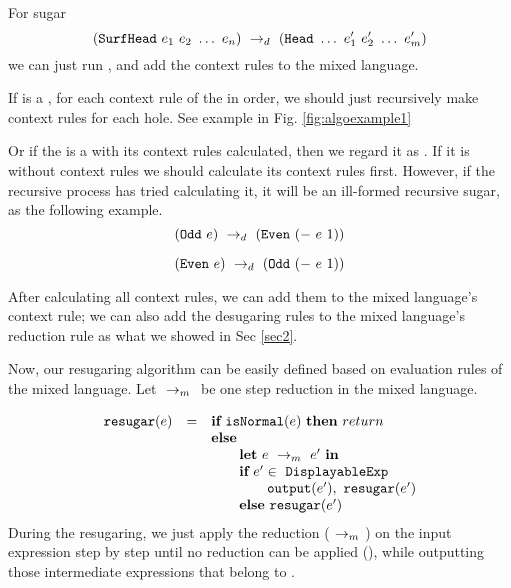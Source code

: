 For sugar 
\[
(\mbox{\tt SurfHead}~e_1~e_2~\ldots~e_n) ~\rightarrow_d~ (\mbox{\tt Head}~\ldots~e_1'~e_2'~\ldots~e_m')
\]
we can just run , and add the context rules to the mixed language.


If  is a , for each context rule of the  in order, we should just recursively make context rules for each hole. See example in Fig.  \ref{fig:algoexample1}

Or if the  is a  with its context rules calculated, then we regard it as . If it is without context rules we should calculate its context rules first. However, if the recursive process has tried calculating it, it will be an ill-formed recursive sugar, as the following example.
\[
(\mbox{\tt Odd}~e) ~\rightarrow_d~ (\mbox{\tt Even}~(-~e~1))
\]

\[
(\mbox{\tt Even}~e) ~\rightarrow_d~ (\mbox{\tt Odd}~(-~e~1))
\]

After calculating all context rules, we can add them to the mixed language's context rule; we can also add the desugaring rules to the mixed language's reduction rule as what we showed in Sec \ref{sec2}.


Now, our resugaring algorithm can be easily defined based on evaluation rules of the mixed language. Let $~\rightarrow_m~$ be one step reduction in the mixed language.

\[
\begin{array}{llll}
\mbox{\tt resugar} (e) &=& \mbox{\rm \bf if}~\mbox{\tt isNormal}(e)~\mbox{\rm \bf then}~return\\
              & & \mbox{\rm \bf else}~\\
							& & \qquad \mbox{\rm \bf let}~e ~\rightarrow_m~e'~\mbox{\rm \bf in}\\
							& & \qquad \mbox{\rm \bf if}~e' \in~\mbox{\tt DisplayableExp} \\
							& & \qquad \qquad \mbox{\tt output}(e'),~\mbox{\tt resugar}(e')\\
							& & \qquad \mbox{\rm \bf else}~\mbox{\tt resugar}(e')
\end{array}
\]
During the resugaring, we just apply the reduction ($~\rightarrow_m~$) on the input expression step by step until no reduction can be applied (), while outputting those intermediate expressions that belong to .


